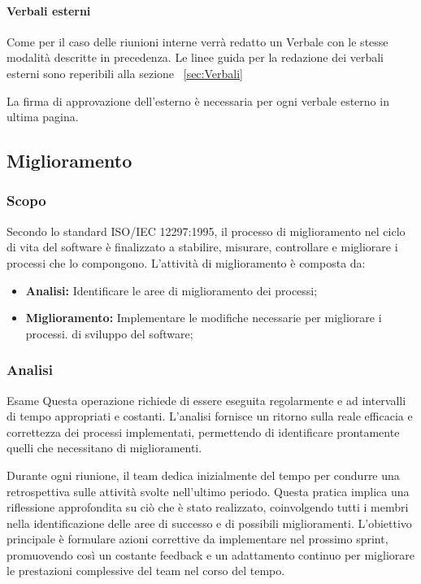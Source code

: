 \documentclass{article}
\begin{document}
\paragraph*{Verbali esterni}
Come per il caso delle riunioni interne verrà redatto un Verbale con le stesse
modalità descritte in precedenza.
Le linee guida per la redazione dei verbali esterni sono reperibili alla sezione  ~\ref{sec:Verbali}

\vspace{0.1cm}

La firma di approvazione dell'esterno è necessaria per ogni verbale esterno in ultima pagina.

\subsection{Miglioramento}
\subsubsection{Scopo}
Secondo lo standard ISO/IEC 12297:1995, il processo di miglioramento nel ciclo di vita del software è finalizzato a stabilire, misurare, controllare e migliorare i processi che lo compongono.
L'attività di miglioramento è composta da:
 \begin{itemize}
    \item \textbf{Analisi:} Identificare le aree di miglioramento dei processi;
    \item  \textbf{Miglioramento:} Implementare le modifiche necessarie per migliorare i processi.
    di sviluppo del software;
 \end{itemize}
 \subsubsection{Analisi}
 Esame
Questa operazione richiede di essere eseguita regolarmente e ad intervalli di tempo appropriati e costanti. L'analisi fornisce un ritorno sulla reale efficacia e correttezza dei processi implementati, permettendo di identificare prontamente quelli che necessitano di miglioramenti.

\vspace*{0.1cm}

Durante ogni riunione, il team dedica inizialmente del tempo per condurre una retrospettiva sulle attività svolte nell'ultimo periodo. Questa pratica implica una riflessione approfondita su ciò che è stato realizzato, coinvolgendo tutti i membri nella identificazione delle aree di successo e di possibili miglioramenti. L'obiettivo principale è formulare azioni correttive da implementare nel prossimo sprint, promuovendo così un costante feedback e un adattamento continuo per migliorare le prestazioni complessive del team nel corso del tempo.
\end{document}
